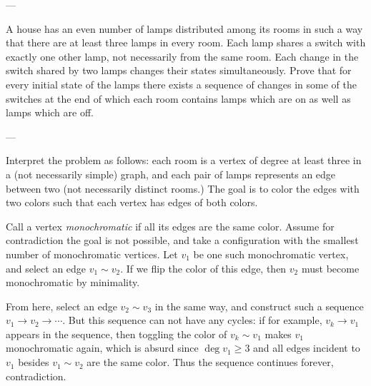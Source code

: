 
---

A house has an even number of lamps distributed among its rooms in such a way that there are at least three lamps in every room. Each lamp shares a switch with exactly one other lamp, not necessarily from the same room. Each change in the switch shared by two lamps changes their states simultaneously. Prove that for every initial state of the lamps there exists a sequence of changes in some of the switches at the end of which each room contains lamps which are on as well as lamps which are off.

---

Interpret the problem as follows: each room is a vertex of degree at least three in a (not necessarily simple) graph, and each pair of lamps represents an edge between two (not necessarily distinct rooms.) The goal is to color the edges with two colors such that each vertex has edges of both colors.

Call a vertex \emph{monochromatic} if all its edges are the same color. Assume for contradiction the goal is not possible, and take a configuration with the smallest number of monochromatic vertices. Let $v_1$ be one such monochromatic vertex, and select an edge $v_1\sim v_2$. If we flip the color of this edge, then $v_2$ must become monochromatic by minimality.

From here, select an edge $v_2\sim v_3$ in the same way, and construct such a sequence $v_1\to v_2\to\cdots$. But this sequence can not have any cycles: if for example, $v_k\to v_1$ appears in the sequence, then toggling the color of $v_k\sim v_1$ makes $v_1$ monochromatic again, which is absurd since $\deg v_1\ge3$ and all edges incident to $v_1$ besides $v_1\sim v_2$ are the same color. Thus the sequence continues forever, contradiction.

